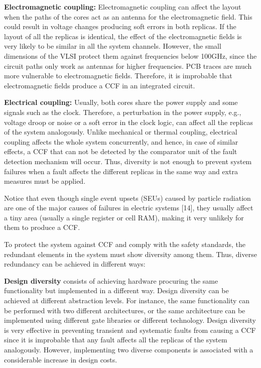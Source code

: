 \textbf{Electromagnetic coupling:} Electromagnetic coupling can affect the layout when the paths of the cores act as an antenna for the electromagnetic field. This could result in voltage changes producing soft errors in both replicas. If the layout of all the replicas is identical, the effect of the electromagnetic fields is very likely to be similar in all the system channels. However, the small dimensions of the VLSI protect them against frequencies below 100GHz, since the circuit paths only work as antennas for higher frequencies. PCB traces are much more vulnerable to electromagnetic fields. Therefore, it is improbable that electromagnetic fields produce a CCF in an integrated circuit.

\textbf{Electrical coupling:} Usually, both cores share the power supply and some signals such as the clock. Therefore, a perturbation in the power supply, e.g., voltage droop or noise or a soft error in the clock logic, can affect all the replicas of the system analogously. Unlike mechanical or thermal coupling, electrical coupling affects the whole system concurrently, and hence, in case of similar effects, a CCF that can not be detected by the comparator unit of the fault detection mechanism will occur. Thus, diversity is not enough to prevent system failures when a fault affects the different replicas in the same way and extra measures must be applied. 

Notice that even though single event upsets (SEUs) caused by particle radiation are one of the major causes of failures in electric systems [14], they usually affect a tiny area (usually a single register or cell RAM), making it very unlikely for them to produce a CCF.   

To protect the system against CCF and comply with the safety standards, the redundant elements in the system must show diversity among them. Thus, diverse redundancy can be achieved in different ways: 

\textbf{Design diversity} consists of achieving hardware procuring the same functionality but implemented in a different way. Design diversity can be achieved at different abstraction levels. For instance, the same functionality can be performed with two different architectures, or the same architecture can be implemented using different gate libraries or different technology. Design diversity is very effective in preventing transient and systematic faults from causing a CCF since it is improbable that any fault affects all the replicas of the system analogously. However, implementing two diverse components is associated with a considerable increase in design costs.

